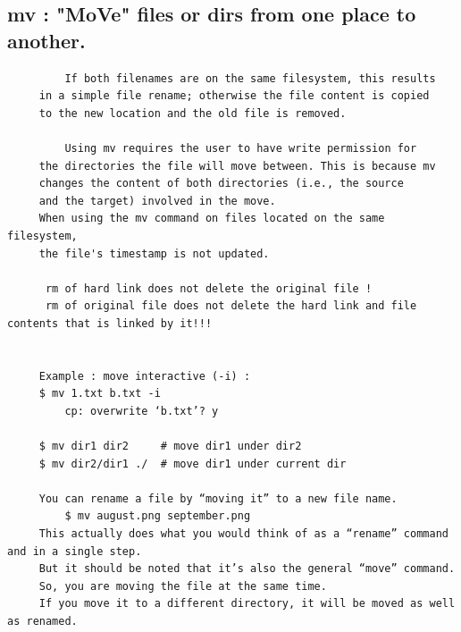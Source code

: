 \documentclass[a4paper,12pt]{article}
\begin{document}
\subsection{mv       : "MoVe" files or dirs from one place to another.}
\begin{verbatim}
         If both filenames are on the same filesystem, this results
     in a simple file rename; otherwise the file content is copied
     to the new location and the old file is removed.
     
         Using mv requires the user to have write permission for 
     the directories the file will move between. This is because mv 
     changes the content of both directories (i.e., the source
     and the target) involved in the move. 
     When using the mv command on files located on the same filesystem, 
     the file's timestamp is not updated.
     
      rm of hard link does not delete the original file !
      rm of original file does not delete the hard link and file contents that is linked by it!!!
      

     Example : move interactive (-i) : 
     $ mv 1.txt b.txt -i
         cp: overwrite ‘b.txt’? y

     $ mv dir1 dir2     # move dir1 under dir2
     $ mv dir2/dir1 ./  # move dir1 under current dir

     You can rename a file by “moving it” to a new file name. 
         $ mv august.png september.png
     This actually does what you would think of as a “rename” command and in a single step. 
     But it should be noted that it’s also the general “move” command. 
     So, you are moving the file at the same time. 
     If you move it to a different directory, it will be moved as well as renamed.
\end{verbatim}
\end{document}
